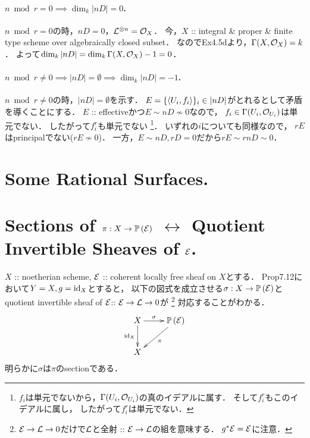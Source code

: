 \documentclass[a4paper]{jsarticle}
\newcommand{\pbundle}{\mathbb{P}\,}
\begin{document}
    \paragraph{$n \bmod r=0 \implies \dim_k |nD|=0$.}
    $n \bmod r=0$の時，$nD=0$，$\shL^{\otimes n}=\shO_X$．
    今，$X$ :: integral \& proper \& finite type scheme over algebraically closed subset．
    なのでEx4.5dより，$\Gamma(X, \shO_X)=k$．
    よって$\dim_k |nD|=\dim_k \Gamma(X, \shO_X)-1=0$．

    \paragraph{$n \bmod r \neq 0 \implies |nD|=\emptyset \implies \dim_k |nD|=-1$.}
    $n \bmod r \neq 0$の時，$|nD|=\emptyset$を示す．
    $E=\{\sect{U_i}{f_i}\}_i \in |nD|$がとれるとして矛盾を導くことにする．
    $E$ :: effectiveかつ$E \sim nD \not \sim 0$なので，
    $f_i \in \Gamma(U_i, \shO_{U_i})$は単元でない．
    したがって$f_i^r$も単元でない
    \footnote
    {
        $f_i$は単元でないから，$\Gamma(U_i, \shO_{U_i})$の真のイデアルに属す．
        そして$f_i^r$もこのイデアルに属し，
        したがって$f_i^r$は単元でない．
    }．
    いずれの$i$についても同様なので，
    $rE$はprincipalでない($rE \not \sim 0$)．
    一方，$E \sim nD, rD=0$だから$rE \sim rnD \sim 0$．

\section{Some Rational Surfaces.} %

\section{Sections of $\pi: X \to \pbundle(\shE)$
    $\leftrightarrow$ Quotient Invertible Sheaves of $\shE$.} %

    $X$ :: noetherian scheme,
    $\shE$ :: coherent locally free sheaf on $X$とする．
    Prop7.12において$Y=X, g=\id[X]$とすると，
    以下の図式を成立させる$\sigma: X \to \pbundle(\shE)$と
    quotient invertible sheaf of $\shE $:: $\shE \to \shL \to 0$が
    \footnote
    {
        $\shE \to \shL \to 0$だけで$\shL$と全射 :: $\shE \to \shL$の組を意味する．
        $g^*\shE=\shE$に注意．
    }
    対応することがわかる．
    \[
        \xymatrix
        {
            X \ar[r]^-{\sigma}\ar[d]_-{\id[X]}& \pbundle(\shE) \ar[ld]^-{\pi} \\
            X
        }
    \]
    明らかに$\sigma$は$\pi$のsectionである．
    
\end{document}
